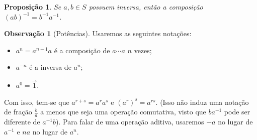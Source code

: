 \documentclass[a4paper,12pt]{article}
\theoremstyle{plain}
\newtheorem{proposicao}{Proposição}[section]
\theoremstyle{definition}
\newtheorem{observacao}{Observação}[section]
\begin{document}
\begin{proposicao}
	Se \(a,b\in S\) possuem inversa, então a composição \((ab)^{-1} = b^{-1}a^{-1}\).
\end{proposicao}

\begin{observacao}[Potências]
	Usaremos as seguintes notações:
	\begin{itemize}
		\item \(a^n = a^{n-1}a\) é a composição de \(a\dotsb a\) \(n\) vezes;
		\item \(a^{-n}\) é a inversa de \(a^n\);
		\item \(a^0 = \vec{1}\).
	\end{itemize}
	
	Com isso, tem-se que \(a^{r+s} = a^ra^s\) e \((a^r)^s = a^{rs}\). (Isso
	não induz uma notação de fração \(\frac{b}{a}\) a menos que seja uma operação
	comutativa, visto que \(ba^{-1}\) pode ser diferente de \(a^{-1}b\)).
	Para falar de uma operação aditiva, usaremos \(-a\) no lugar de
	\(a^{-1}\) e \(na\) no lugar de \(a^n\).
\end{observacao}


{}



\end{document}
